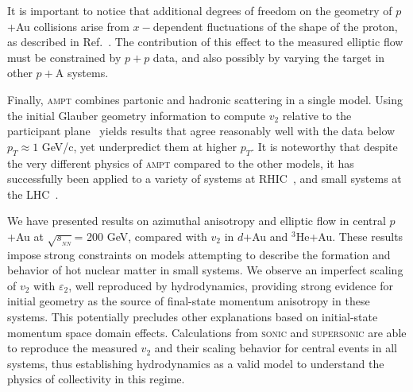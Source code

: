 \documentclass[%
reprint,
showpacs,preprintnumbers,
 amsmath,amssymb,
 aps,
]{revtex4-1}
\newcommand{\pt}{\mbox{$p_T$}\xspace}
\newcommand{\sqsn}{\mbox{$\sqrt{s_{_{NN}}}$}\xspace}
\newcommand{\dau}{\mbox{$d$+Au}\xspace}
\newcommand{\pau}{\mbox{$p$+Au}\xspace}
\newcommand{\hau}{\mbox{$^3\text{He}$+Au}\xspace}
\begin{document}
It is important to notice that additional degrees of freedom on the geometry of \pau collisions arise from $x-$dependent fluctuations of the shape of the proton, as described in Ref.~\cite{Schlichting:2014ipa}. The contribution of this effect to the measured elliptic flow must be constrained by $p+p$ data, and also possibly by varying the target in other $p+$A systems.

Finally, \textsc{ampt} combines partonic and hadronic scattering in a single model. Using the initial Glauber geometry information to compute $v_2$ relative to the participant plane~\cite{Koop:2015wea} yields results that agree reasonably well with the data below $\pt \approx 1$ GeV/c, yet underpredict them at higher \pt. It is noteworthy that despite the very different physics of \textsc{ampt} compared to the other models, it has successfully been applied to a variety of systems at RHIC~\cite{Adare:2015cpn,Koop:2015wea}, and small systems at the LHC~\cite{ma_long-range_2014,ma_long-range_2014}.

We have presented results on azimuthal anisotropy and elliptic flow in central \pau at \sqsn = 200 GeV, compared with $v_2$ in \dau and \hau. These results impose strong constraints on models attempting to describe the formation and behavior of hot nuclear matter in small systems. We observe an imperfect scaling of $v_2$ with $\varepsilon_2$, well reproduced by hydrodynamics, providing strong evidence for initial geometry as the source of final-state momentum anisotropy in these systems. This potentially precludes other explanations based on initial-state momentum space domain effects. Calculations from \textsc{sonic} and \textsc{supersonic} are able to reproduce the measured $v_2$ and their scaling behavior for central events in all systems, thus establishing hydrodynamics as a valid model to understand the physics of collectivity in this regime. 


\end{document}
